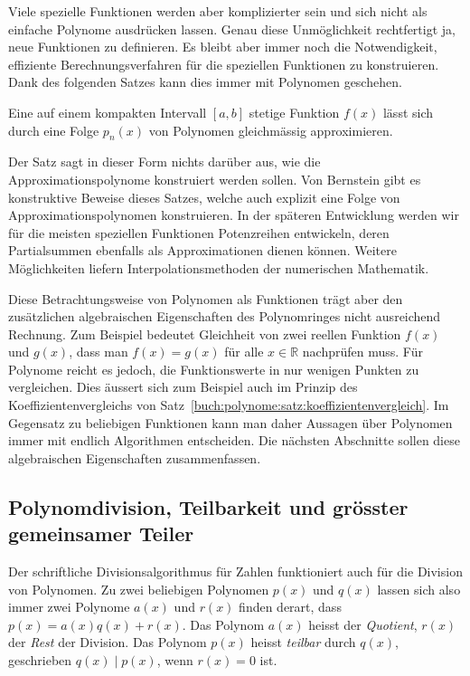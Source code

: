 Viele spezielle Funktionen werden aber komplizierter sein und
sich nicht als einfache Polynome ausdrücken lassen.
Genau diese Unmöglichkeit rechtfertigt ja, neue Funktionen
zu definieren.
Es bleibt aber immer noch die Notwendigkeit, effiziente 
Berechnungsverfahren für die speziellen Funktionen zu konstruieren.
Dank des folgenden Satzes kann dies immer mit Polynomen geschehen.

\begin{satz}[Weierstrass]
%
%
\label{buch:potenzen:satz:weierstrass}
%
Eine auf einem kompakten Intervall $[a,b]$ stetige Funktion $f(x)$
lässt sich durch eine Folge $p_n(x)$ von Polynomen gleichmässig
approximieren.
\end{satz}

Der Satz sagt in dieser Form nichts darüber aus, wie die
Approximationspolynome konstruiert werden sollen.
%
Von Bernstein gibt es konstruktive Beweise dieses Satzes,
%
welche auch explizit eine Folge von Approximationspolynomen
konstruieren.
In der späteren Entwicklung werden wir für die meisten
speziellen Funktionen Potenzreihen entwickeln, deren Partialsummen
ebenfalls als Approximationen dienen können.
Weitere Möglichkeiten liefern Interpolationsmethoden der
numerischen Mathematik.

Diese Betrachtungsweise von Polynomen als Funktionen trägt
aber den zusätzlichen algebraischen Eigenschaften des Polynomringes
nicht ausreichend Rechnung.
Zum Beispiel bedeutet Gleichheit von zwei reellen Funktion $f(x)$ und
$g(x)$, dass man $f(x)=g(x)$ für alle $x\in\mathbb{R}$ nachprüfen
muss.
Für Polynome reicht es jedoch, die Funktionswerte in nur wenigen
Punkten zu vergleichen.
Dies äussert sich zum Beispiel auch im Prinzip des
Koeffizientenvergleichs von
Satz~\ref{buch:polynome:satz:koeffizientenvergleich}.
Im Gegensatz zu beliebigen Funktionen kann man daher Aussagen
über Polynomen immer mit endlich Algorithmen entscheiden.
Die nächsten Abschnitte sollen diese algebraischen Eigenschaften
zusammenfassen.

%
%
\subsection{Polynomdivision, Teilbarkeit und grösster gemeinsamer Teiler}
Der schriftliche Divisionsalgorithmus für Zahlen funktioniert 
auch für die Division von Polynomen.
%
Zu zwei beliebigen Polynomen $p(x)$ und $q(x)$ lassen sich also
immer zwei Polynome $a(x)$ und $r(x)$ finden derart, dass
$p(x) = a(x) q(x) + r(x)$.
Das Polynom $a(x)$ heisst der {\em Quotient}, $r(x)$ der {\em Rest}
der Division.
Das Polynom $p(x)$ heisst {\em teilbar} durch $q(x)$, geschrieben
%
%
$q(x)\mid p(x)$, wenn $r(x)=0$ ist.

